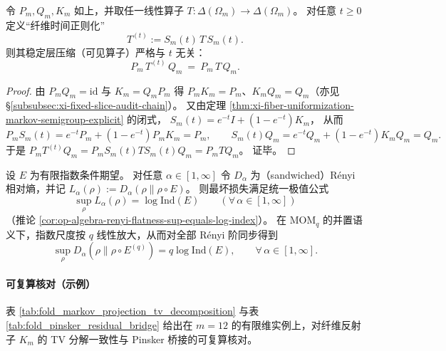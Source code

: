 \begin{proposition}\label{prop:xi-fiber-mixing-time-invisible-on-stable-compression}
令 \(P_m,Q_m,K_m\) 如上，并取任一线性算子 \(T:\Delta(\Omega_m)\to\Delta(\Omega_m)\)。
对任意 \(t\ge 0\) 定义“纤维时间正则化”
\[
T^{(t)}:=S_m(t)\,T\,S_m(t).
\]
则其稳定层压缩（可见算子）严格与 \(t\) 无关：
\[
\boxed{\;
P_m\,T^{(t)}\,Q_m\ =\ P_m\,T\,Q_m.\;}
\]
\end{proposition}
\begin{proof}
由 \(P_mQ_m=\mathrm{id}\) 与 \(K_m=Q_mP_m\) 得 \(P_mK_m=P_m\)、\(K_mQ_m=Q_m\)（亦见 \S\ref{subsubsec:xi-fixed-slice-audit-chain}）。
又由定理 \ref{thm:xi-fiber-uniformization-markov-semigroup-explicit} 的闭式，
\(
S_m(t)=e^{-t}I+(1-e^{-t})K_m
\)，
从而
\[
P_mS_m(t)=e^{-t}P_m+(1-e^{-t})P_mK_m=P_m,
\qquad
S_m(t)Q_m=e^{-t}Q_m+(1-e^{-t})K_mQ_m=Q_m.
\]
于是
\(
P_mT^{(t)}Q_m=P_mS_m(t)TS_m(t)Q_m=P_mTQ_m
\)。
证毕。
\end{proof}

\begin{corollary}\label{cor:xi-renyi-flatness-under-momq-amplification}
设 \(E\) 为有限指数条件期望。
对任意 \(\alpha\in[1,\infty]\) 令 \(D_\alpha\) 为（sandwiched）Rényi 相对熵，并记
\(
L_\alpha(\rho):=D_\alpha(\rho\|\rho\circ E)
\)。
则最坏损失满足统一极值公式
\[
\sup_{\rho}L_\alpha(\rho)=\log\mathrm{Ind}(E)
\qquad(\forall\,\alpha\in[1,\infty])
\]
（推论 \ref{cor:op-algebra-renyi-flatness-sup-equals-log-index}）。
在 \(\mathrm{MOM}_q\) 的并置语义下，指数尺度按 \(q\) 线性放大，从而对全部 Rényi 阶同步得到
\[
\boxed{\;
\sup_{\rho}D_\alpha(\rho\|\rho\circ E^{(q)})=q\log\mathrm{Ind}(E),
\qquad \forall\,\alpha\in[1,\infty].\;}
\]
\end{corollary}

\paragraph{可复算核对（示例）}
表 \ref{tab:fold_markov_projection_tv_decomposition} 与表 \ref{tab:fold_pinsker_residual_bridge} 给出在 \(m=12\) 的有限维实例上，对纤维反射子 \(K_m\) 的 TV 分解一致性与 Pinsker 桥接的可复算核对。


